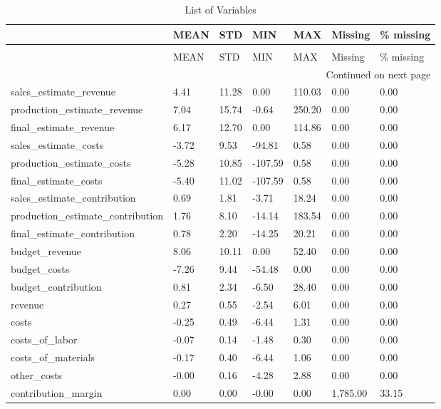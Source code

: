 \begin{landscape}\begin{longtable}[h!]{lllllll}
\caption{List of Variables} \label{eda_1} \\
\toprule
 & MEAN & STD & MIN & MAX & Missing & \% missing \\
\midrule
\endfirsthead
\caption[]{List of Variables} \\
\toprule
 & MEAN & STD & MIN & MAX & Missing & \% missing \\
\midrule
\endhead
\midrule
\multicolumn{7}{r}{Continued on next page} \\
\midrule
\endfoot
\bottomrule
\endlastfoot
sales_estimate_revenue & 4.41 & 11.28 & 0.00 & 110.03 & 0.00 & 0.00 \\
production_estimate_revenue & 7.04 & 15.74 & -0.64 & 250.20 & 0.00 & 0.00 \\
final_estimate_revenue & 6.17 & 12.70 & 0.00 & 114.86 & 0.00 & 0.00 \\
sales_estimate_costs & -3.72 & 9.53 & -94.81 & 0.58 & 0.00 & 0.00 \\
production_estimate_costs & -5.28 & 10.85 & -107.59 & 0.58 & 0.00 & 0.00 \\
final_estimate_costs & -5.40 & 11.02 & -107.59 & 0.58 & 0.00 & 0.00 \\
sales_estimate_contribution & 0.69 & 1.81 & -3.71 & 18.24 & 0.00 & 0.00 \\
production_estimate_contribution & 1.76 & 8.10 & -14.14 & 183.54 & 0.00 & 0.00 \\
final_estimate_contribution & 0.78 & 2.20 & -14.25 & 20.21 & 0.00 & 0.00 \\
budget_revenue & 8.06 & 10.11 & 0.00 & 52.40 & 0.00 & 0.00 \\
budget_costs & -7.26 & 9.44 & -54.48 & 0.00 & 0.00 & 0.00 \\
budget_contribution & 0.81 & 2.34 & -6.50 & 28.40 & 0.00 & 0.00 \\
revenue & 0.27 & 0.55 & -2.54 & 6.01 & 0.00 & 0.00 \\
costs & -0.25 & 0.49 & -6.44 & 1.31 & 0.00 & 0.00 \\
costs_of_labor & -0.07 & 0.14 & -1.48 & 0.30 & 0.00 & 0.00 \\
costs_of_materials & -0.17 & 0.40 & -6.44 & 1.06 & 0.00 & 0.00 \\
other_costs & -0.00 & 0.16 & -4.28 & 2.88 & 0.00 & 0.00 \\
contribution_margin & 0.00 & 0.00 & -0.00 & 0.00 & 1,785.00 & 33.15 \\

\end{longtable}
\end{landscape}
